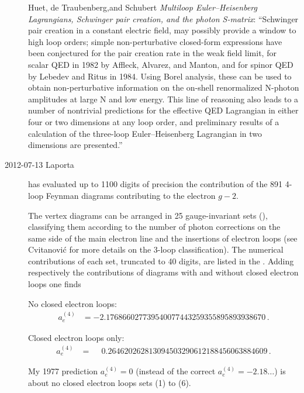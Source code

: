 \begin{description}
Huet, de Traubenberg,and Schubert
{\em Multiloop {Euler--Heisenberg Lagrangians, Schwinger} pair creation,
and the photon {S-matrix}}:
``Schwinger pair creation in a constant electric field, may possibly
provide a window to high loop orders; simple non-perturbative closed-form
expressions have been conjectured for the pair creation rate in the weak
field limit, for scalar QED in 1982 by Affleck, Alvarez, and
Manton, and for spinor QED by Lebedev and
Ritus in 1984. Using Borel analysis, these can be used to
obtain non-perturbative information on the on-shell renormalized N-photon
amplitudes at large N and low energy. This line of reasoning also leads
to a number of nontrivial predictions for the effective QED Lagrangian in
either four or two dimensions at any loop order, and preliminary results
of a calculation of the three-loop Euler--Heisenberg Lagrangian in two
dimensions are presented.''



\item[2012-07-13 Laporta] 
has evaluated up to 1100 digits of precision the contribution of the 891
4-loop Feynman diagrams contributing to the electron $g-2$.

\def\aql#1{a_e^{(#1)}}

The vertex diagrams can be arranged in 25
gauge-invariant sets (),
classifying them according to the number of photon corrections on the
same side of the main electron line and the insertions of electron loops (see
Cvitanovi\'c for more details on the 3-loop classification).
The numerical contributions of each set, truncated to 40 digits, are
listed in the .
Adding respectively the contributions of diagrams with and without
closed electron loops one finds

No closed electron loops:
\begin{align}
 \aql{4}&= -2.176866027739540077443259355895893938670 \,.
\end{align}

Closed electron loops only:
\begin{align}
 \aql{4}&=  \phantom{+}0.264620262813094503290612188456063884609 \,.
\end{align}

My 1977 prediction $\aql{4} = 0$
(instead of the correct $\aql{4}= -2.18\ldots$) is about no closed
electron loops sets (1) to (6).


\end{description}
